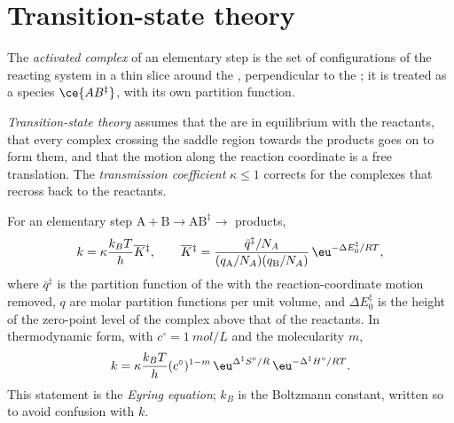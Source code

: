 \section{Transition-state theory}

\begin{definition}\label{def:b3:rate-theories:activated-complex}
The \emph{activated complex} of an elementary step is the
set of configurations of the reacting system in a thin slice around the
, perpendicular to the ; it is treated as a
species $\ce{AB^{\ddagger}}$, with its own partition function.
\end{definition}

\begin{definition}\label{def:b3:rate-theories:tst}
\emph{Transition-state theory} assumes that the
 are in equilibrium with the reactants, that every complex
crossing the saddle region towards the products goes on to form them, and that
the motion along the reaction coordinate is a free translation. The
\emph{transmission coefficient} $\kappa \le 1$ corrects for
the complexes that recross back to the reactants.
\end{definition}

\begin{theorem}\label{thm:b3:rate-theories:eyring}
For an elementary step $\mathrm{A + B} \to \mathrm{AB}^{\ddagger} \to$ products,
\[
  k = \kappa\frac{k_BT}{h}\overline{K}{}^{\ddagger}, \qquad
  \overline{K}{}^{\ddagger} = \frac{\bar q^{\ddagger}/N_A}{(q_{\mathrm A}/N_A)(q_{\mathrm B}/N_A)}\,\eu^{-\Delta E_0^{\ddagger}/RT},
\]
where $\bar q^{\ddagger}$ is the partition function of the  with the
reaction-coordinate motion removed, $q$ are molar partition functions per unit
volume, and $\Delta E_0^{\ddagger}$ is the height of the zero-point level of the complex above
that of the reactants. In thermodynamic form, with $c^\circ = \qty{1}{mol/L}$ and the
molecularity $m$,
\[
  k = \kappa\frac{k_BT}{h}(c^\circ)^{1-m}\,\eu^{\Delta^{\ddagger}S^\circ/R}\,\eu^{-\Delta^{\ddagger}H^\circ/RT}.
\]
This statement is the \emph{Eyring equation}; $k_B$ is the
Boltzmann constant, written so to avoid confusion with $k$.
\end{theorem}


